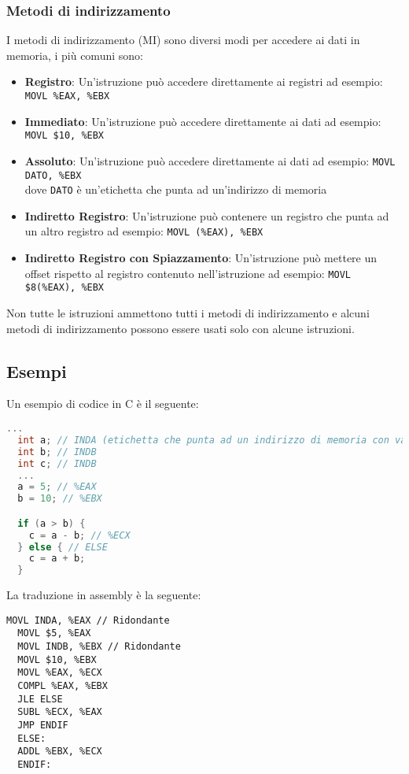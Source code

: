 \documentclass[a4paper]{article}
\theoremstyle{break}
\theoremstyle{break}
\theoremstyle{break}
\theoremstyle{break}
\begin{document}
\subsubsection{Metodi di indirizzamento}
I metodi di indirizzamento (MI) sono diversi modi per accedere ai dati in memoria, i
più comuni sono:
\begin{itemize}
	\item \textbf{Registro}: Un'istruzione può accedere direttamente ai registri
	      ad esempio: \texttt{MOVL \%EAX, \%EBX}
	\item \textbf{Immediato}: Un'istruzione può accedere direttamente ai dati
	      ad esempio: \texttt{MOVL \$10, \%EBX}
	\item \textbf{Assoluto}: Un'istruzione può accedere direttamente ai dati
	      ad esempio: \texttt{MOVL DATO, \%EBX}\\
	      dove \texttt{DATO} è un'etichetta che punta ad un'indirizzo di memoria
	\item \textbf{Indiretto Registro}: Un'istruzione può contenere un registro che punta ad un altro registro
	      ad esempio: \texttt{MOVL (\%EAX), \%EBX}
	\item \textbf{Indiretto Registro con Spiazzamento}: Un'istruzione può mettere un offset
	      rispetto al registro contenuto nell'istruzione
	      ad esempio: \texttt{MOVL \$8(\%EAX), \%EBX}
\end{itemize}

\noindent Non tutte le istruzioni ammettono tutti i metodi di indirizzamento e alcuni metodi di indirizzamento
possono essere usati solo con alcune istruzioni.

\subsection{Esempi}
Un esempio di codice in C è il seguente:
\begin{lstlisting}[language=C]
  ...
  int a; // INDA (etichetta che punta ad un indirizzo di memoria con valore intero)
  int b; // INDB
  int c; // INDB
  ...
  a = 5; // %EAX
  b = 10; // %EBX

  if (a > b) {
    c = a - b; // %ECX
  } else { // ELSE
    c = a + b;
  }
  \end{lstlisting}

La traduzione in assembly è la seguente:
\begin{lstlisting}[language={[x86masm]Assembler}]
  MOVL INDA, %EAX // Ridondante
  MOVL $5, %EAX
  MOVL INDB, %EBX // Ridondante
  MOVL $10, %EBX
  MOVL %EAX, %ECX
  COMPL %EAX, %EBX
  JLE ELSE
  SUBL %ECX, %EAX
  JMP ENDIF
  ELSE:
  ADDL %EBX, %ECX
  ENDIF:
\end{lstlisting}
\end{document}
